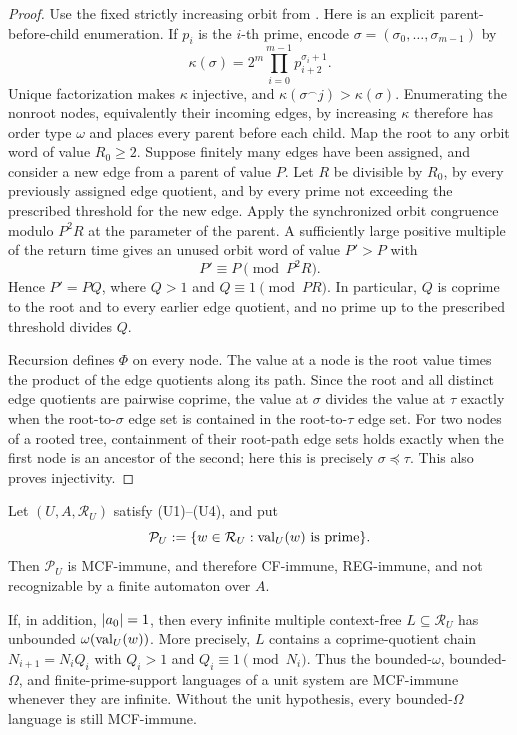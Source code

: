 \begin{proof}
  Use the fixed strictly increasing orbit from
  . Here is an explicit
  parent-before-child enumeration. If \(p_i\) is the \(i\)-th prime, encode
  \(\sigma=(\sigma_0,\ldots,\sigma_{m-1})\) by
  \[
    \kappa(\sigma)=2^m\prod_{i=0}^{m-1}p_{i+2}^{\sigma_i+1}.
  \]
  Unique factorization makes \(\kappa\) injective, and
  \(\kappa(\sigma^\frown j)>\kappa(\sigma)\). Enumerating the nonroot
  nodes, equivalently their incoming edges, by increasing \(\kappa\)
  therefore has order type \(\omega\) and places every parent before each
  child. Map
  the root to any orbit word of value \(R_0\ge2\). Suppose finitely many
  edges have been assigned, and consider a new edge from a parent of
  value \(P\). Let \(R\) be divisible by \(R_0\), by every previously
  assigned edge quotient, and by every prime not exceeding the prescribed
  threshold for the new edge. Apply the synchronized orbit congruence
  modulo \(P^2R\) at the parameter of the parent. A sufficiently large
  positive multiple of the return time gives an unused orbit word of
  value \(P'>P\) with
  \[
    P'\equiv P\pmod {P^2R}.
  \]
  Hence \(P'=PQ\), where \(Q>1\) and \(Q\equiv1\pmod {PR}\). In
  particular, \(Q\) is coprime to the root and to every earlier edge
  quotient, and no prime up to the prescribed threshold divides \(Q\).

  Recursion defines \(\Phi\) on every node. The value at a node is the
  root value times the product of the edge quotients along its path.
  Since the root and all distinct edge quotients are pairwise coprime,
  the value at \(\sigma\) divides the value at \(\tau\) exactly when the
  root-to-\(\sigma\) edge set is contained in the root-to-\(\tau\) edge
  set. For two nodes of a rooted tree, containment of their root-path edge
  sets holds exactly when the first node is an ancestor of the second;
  here this is precisely \(\sigma\preceq\tau\). This also proves injectivity.
\end{proof}

\begin{theorem}
  \label{thm:recurrent-numeration-prime-cf-immunity}
  Let \((U,A,\mathcal R_U)\) satisfy \textup{(U1)--(U4)}, and put
  \[
    \mathcal P_U
      :=\{w\in\mathcal R_U:\operatorname{val}_U(w)\text{ is prime}\}.
  \]
  Then \(\mathcal P_U\) is MCF-immune, and therefore CF-immune,
  REG-immune, and not recognizable by a finite automaton over \(A\).

  If, in addition, \(\lvert a_0 \rvert=1\), then every infinite multiple
  context-free
  \(L\subseteq\mathcal R_U\) has unbounded
  \(\omega(\operatorname{val}_U(w))\). More precisely, \(L\) contains a
  coprime-quotient chain \(N_{i+1}=N_iQ_i\) with
  \(Q_i>1\) and \(Q_i\equiv1\pmod {N_i}\). Thus the bounded-\(\omega\),
  bounded-\(\Omega\), and finite-prime-support languages of a unit
  system are MCF-immune whenever they are infinite. Without the unit
  hypothesis, every bounded-\(\Omega\) language is still MCF-immune.
\end{theorem}


